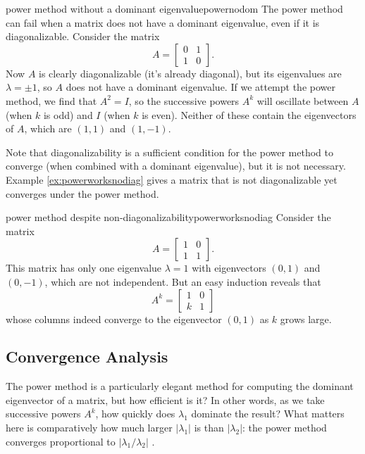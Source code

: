 \documentclass{article}
\begin{document}
\begin{example}{power method without a dominant eigenvalue}{powernodom}
  The power method can fail when a matrix does not have a dominant eigenvalue, even if it is diagonalizable. Consider the matrix
  \begin{equation*}
    A = \begin{bmatrix}0 & 1 \\ 1 & 0\end{bmatrix}.
  \end{equation*}
  Now $A$ is clearly diagonalizable (it's already diagonal), but its eigenvalues are $\lambda = \pm 1$, so $A$ does not have a dominant eigenvalue. If we attempt the power method, we find that $A^2 = I$, so the successive powers $A^k$ will oscillate between $A$ (when $k$ is odd) and $I$ (when $k$ is even). Neither of these contain the eigenvectors of $A$, which are $(1,1)$ and $(1,-1)$.
\end{example}

Note that diagonalizability is a sufficient condition for the power method to converge (when combined with a dominant eigenvalue), but it is not necessary. Example \ref{ex:powerworksnodiag} gives a matrix that is not diagonalizable yet converges under the power method.

\begin{example}{power method despite non-diagonalizability}{powerworksnodiag}
  Consider the matrix
  \begin{equation*}
    A = \begin{bmatrix}1 & 0 \\ 1 & 1\end{bmatrix}.
  \end{equation*}
  This matrix has only one eigenvalue $\lambda = 1$ with eigenvectors $(0,1)$ and $(0,-1)$, which are not independent. But an easy induction reveals that
  \begin{equation*}
    A^k = \begin{bmatrix}1 & 0 \\ k & 1\end{bmatrix}
  \end{equation*}
  whose columns indeed converge to the eigenvector $(0, 1)$ as $k$ grows large.
\end{example}

\subsection{Convergence Analysis}
The power method is a particularly elegant method for computing the dominant eigenvector of a matrix, but how efficient is it? In other words, as we take successive powers $A^k$, how quickly does $\lambda_1$ dominate the result? What matters here is comparatively how much larger $|\lambda_1|$ is than $|\lambda_2|$: the power method converges proportional to $|\lambda_1 / \lambda_2|$ \cite[p.~529]{strang}.
\end{document}

